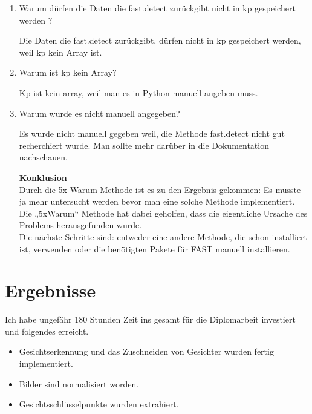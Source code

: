 \begin{flushleft}
\begin{enumerate}
	\item	Warum dürfen die Daten die fast.detect zurückgibt nicht in kp gespeichert
	werden ? 
	
	Die Daten die fast.detect zurückgibt, dürfen nicht in kp gespeichert werden, weil
	kp kein Array ist. 
	
	\item	Warum ist kp kein Array? 
	
	Kp ist kein array, weil man es in Python  manuell angeben muss.
	
	\item Warum wurde es nicht manuell angegeben? 
	
	Es wurde nicht manuell gegeben weil, die Methode fast.detect nicht gut
	recherchiert wurde. Man sollte mehr darüber in die Dokumentation nachschauen.
	
	\textbf{Konklusion}\\
	Durch die 5x Warum Methode ist es zu den Ergebnis gekommen: Es musste ja mehr
	untersucht werden bevor man eine solche Methode implementiert. Die „5xWarum“
	Methode hat dabei geholfen, dass die eigentliche Ursache des Problems
	herausgefunden wurde.\\
	Die nächste Schritte sind: entweder eine andere Methode, die schon installiert
	ist, verwenden oder die benötigten Pakete für FAST manuell installieren. 
	
	
	
\end{enumerate}

\end{flushleft}

\section{Ergebnisse}

\begin{flushleft}
	
Ich habe ungefähr 180 Stunden Zeit ins gesamt für die Diplomarbeit investiert und folgendes erreicht.\\

\begin{itemize}
	\item Gesichtserkennung und das Zuschneiden von Gesichter wurden fertig
	implementiert.
	\item Bilder sind normalisiert worden.\\
	\item Gesichtsschlüsselpunkte wurden extrahiert.\\
	
\end{itemize}


\end{flushleft}

